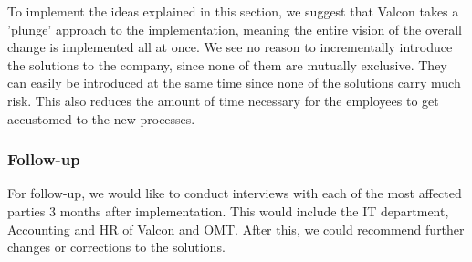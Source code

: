 To implement the ideas explained in this section, we suggest that Valcon takes a 'plunge' approach to the implementation, meaning the entire vision of the overall change is implemented all at once.
We see no reason to incrementally introduce the solutions to the company, since none of them are mutually exclusive. 
They can easily be introduced at the same time since none of the solutions carry much risk.
This also reduces the amount of time necessary for the employees to get accustomed to the new processes.

\subsubsection{Follow-up}
For follow-up, we would like to conduct interviews with each of the most affected parties 3 months after implementation.
This would include the IT department, Accounting and HR of Valcon and OMT.
After this, we could recommend further changes or corrections to the solutions.
